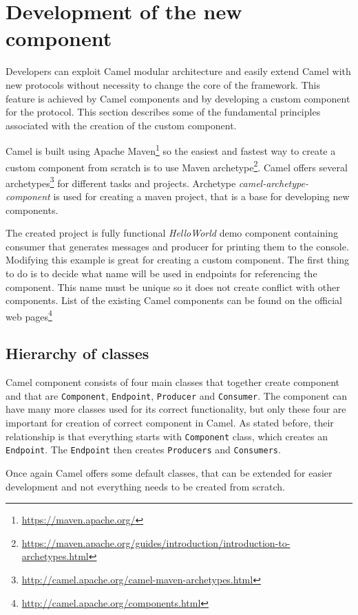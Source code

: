 \documentclass[12pt,final,oneside]{fithesis2}
\begin{document}
 
\section{Development of the new component}\label{component-devel}
Developers can exploit Camel modular architecture and easily extend Camel with new protocols without necessity to change the core of the framework. This feature is achieved by Camel components and by developing a custom component for the protocol. This section describes some of the fundamental principles associated with the creation of the custom component.

Camel is built using Apache Maven\footnote{\url{https://maven.apache.org/}} so the easiest and fastest way to create a custom component from scratch is to use Maven archetype\footnote{\url{https://maven.apache.org/guides/introduction/introduction-to-archetypes.html}}. Camel offers several archetypes\footnote{\url{http://camel.apache.org/camel-maven-archetypes.html}} for different tasks and projects. Archetype \textit{camel-archetype-component} is used for creating a maven project, that is a base for developing new components\cite{camel-comp}. 

The created project is fully functional \textit{HelloWorld} demo component containing consumer that generates messages and producer for printing them to the console. Modifying this example is great for creating a custom component. The first thing to do is to decide what name will be used in endpoints for referencing the component. This name must be unique so it does not create conflict with other components. List of the existing Camel components can be found on the official web pages\footnote{\url{http://camel.apache.org/components.html}}

\subsection{Hierarchy of classes}
Camel component consists of four main classes that together create component and that are \texttt{Component}, \texttt{Endpoint}, \texttt{Producer} and \texttt{Consumer}. The component can have many more classes used for its correct functionality, but only these four are important for creation of correct component in Camel. As stated before, their relationship is that everything starts with \texttt{Component} class, which creates an \texttt{Endpoint}. The \texttt{Endpoint} then creates \texttt{Producers} and \texttt{Consumers}.

Once again Camel offers some default classes, that can be extended for easier development and not everything needs to be created from scratch.
\end{document}
